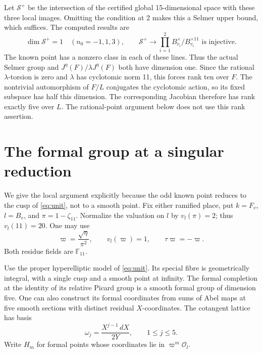 \documentclass[11pt]{article}
\newcommand{\F}{\mathbb F}\newcommand{\OO}{\mathcal O}
\begin{document}
Let \(\mathcal S^+\) be the intersection of the certified global
15-dimensional space with these three local images. Omitting the
condition at 2 makes this a Selmer upper bound, which suffices. The
computed results are
\begin{equation}\label{eq:selmer}
 \dim\mathcal S^+=1\quad(n_0=-1,1,3),\qquad
 \mathcal S^+\longrightarrow
 \prod_{i=1}^2 B_{v_i}^\times/B_{v_i}^{\times11}
 \text{ is injective}.
\end{equation}
The known point has a nonzero class in each of these lines. Thus the
actual Selmer group and \(J^\eta(F)/\lambda J^\eta(F)\) both have
dimension one. Since the rational \(\lambda\)-torsion is zero and
\(\lambda\) has cyclotomic norm 11, this forces rank ten over \(F\).
The nontrivial automorphism of \(F/L\) conjugates the cyclotomic
action, so its fixed subspace has half this dimension. The corresponding
Jacobian therefore has rank exactly five over \(L\).
The rational-point argument below does not use this rank assertion.

\section{The formal group at a singular reduction}
We give the local argument explicitly because the odd known point
reduces to the cusp of \eqref{eq:unit}, not to a smooth point.
Fix either ramified place, put \(k=F_v\), \(l=B_v\), and
\(\pi=1-\zeta_{11}\). Normalize the valuation on \(l\) by
\(v_l(\pi)=2\); thus \(v_l(11)=20\).
One may use
\[
 \varpi=\frac{\sqrt\eta}{\pi^2},\qquad
 v_l(\varpi)=1,\qquad \tau\varpi=-\varpi.
\]
Both residue fields are \(\F_{11}\).

Use the proper hyperelliptic model of \eqref{eq:unit}. Its special
fibre is geometrically integral, with a single cusp and a smooth point
at infinity. The formal completion at the identity of its relative
Picard group is a smooth formal group of dimension five. One can also
construct its formal coordinates from sums of Abel maps at five smooth
sections with distinct residual \(X\)-coordinates. The cotangent lattice
has basis
\[
 \omega_j=\frac{X^{j-1}\,dX}{2Y},\qquad 1\le j\le5.
\]
Write \(H_m\) for formal points whose coordinates lie in
\(\varpi^m\OO_l\).
\end{document}
